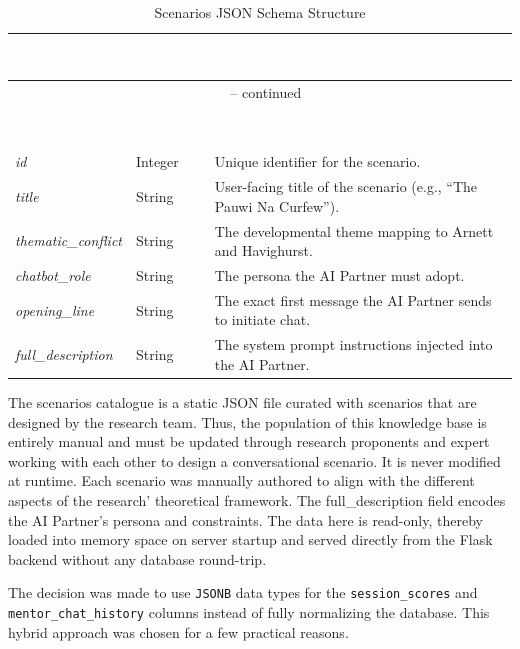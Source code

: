 \begin{longtable}{p{3.5cm} p{2.5cm} p{8cm}}
\caption{Scenarios JSON Schema Structure}
\label{tab:scenarios_json} \\

\rowcolor{headerblue}
\textcolor{white}{\textbf{Key}} &
\textcolor{white}{\textbf{Data Type}} &
\textcolor{white}{\textbf{Description}} \\
\endfirsthead
\multicolumn{3}{c}{\tablename\ \thetable{} -- continued} \\
\rowcolor{headerblue}
\textcolor{white}{\textbf{Key}} &
\textcolor{white}{\textbf{Data Type}} &
\textcolor{white}{\textbf{Description}} \\
\endhead

\midrule
\textit{id} & Integer & Unique identifier for the scenario. \\
\midrule
\textit{title} & String & User-facing title of the scenario (e.g., ``The Pauwi Na Curfew''). \\
\midrule
\textit{thematic\_conflict} & String & The developmental theme mapping to Arnett and Havighurst. \\
\midrule
\textit{chatbot\_role} & String & The persona the AI Partner must adopt. \\
\midrule
\textit{opening\_line} & String & The exact first message the AI Partner sends to initiate chat. \\
\midrule
\textit{full\_description} & String & The system prompt instructions injected into the AI Partner. \\
\bottomrule
\end{longtable}

The scenarios catalogue is a static JSON file curated with scenarios that are designed by the research team. Thus, the population of this knowledge base is entirely manual and must be updated
through research proponents and expert working with each other to design a conversational scenario. It is never modified at runtime. Each scenario was manually authored to align with the different
aspects of the research' theoretical framework. The full\_description field encodes the AI Partner's persona and constraints. The data here is read-only, thereby
loaded into memory space on server startup and served directly from the Flask backend without any database round-trip.

The decision was made to use \texttt{JSONB} data types for the \texttt{session\_scores} and \texttt{mentor\_chat\_history} columns instead of fully normalizing the database. This hybrid approach was chosen for a few practical reasons.

